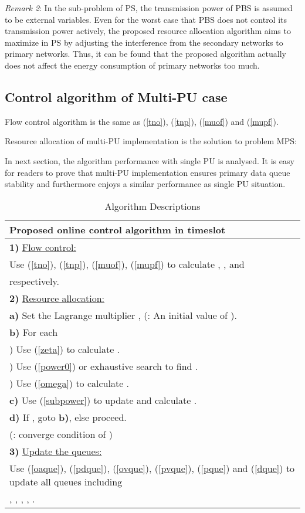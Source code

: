 \documentclass[journal]{IEEEtran}
\begin{document}
{\emph{Remark 2}:
 In the sub-problem of PS, the transmission power of PBS is assumed to be external variables. Even for the worst case that PBS does not control its transmission power actively, the proposed resource allocation algorithm aims to maximize  in PS by adjusting the interference from the secondary networks to primary networks. Thus, it can be found that the proposed algorithm actually does not affect the energy consumption of  primary networks too much.  }


 { \subsection{Control algorithm of Multi-PU case}

Flow control algorithm is the same as (\ref{tno}), (\ref{tnp}), (\ref{muof}) and  (\ref{mupf}).

Resource allocation of multi-PU implementation is the solution to problem MPS:


In next section, the algorithm performance with single PU is analysed. It is easy for  readers to prove that multi-PU implementation ensures primary data queue stability and furthermore enjoys a similar
performance as single PU situation. }
\begin{table}\label{alg}
\renewcommand{\arraystretch}{1.3}
\caption{Algorithm Descriptions}
\centering
\begin{tabular}{|l|}
\hline
{Proposed online control algorithm in timeslot }\\
\hline
\textbf{1)} \underline{Flow control:} \\
\quad Use (\ref{tno}), (\ref{tnp}), (\ref{muof}), (\ref{mupf}) to calculate , ,  and 
\\
\quad respectively.\\
\textbf{2)} \underline{Resource allocation:}\\
\quad \textbf{a)} Set the Lagrange multiplier , (: An initial value of ).\\
\quad \textbf{b)} For each \\
\qquad\qquad \romannumeral1) Use (\ref{zeta}) to calculate .\\
\qquad\qquad \romannumeral2) Use (\ref{power0}) or exhaustive search to find .\\
\qquad\qquad \romannumeral3) Use (\ref{omega}) to calculate .\\
\quad \textbf{c)} Use (\ref{subpower}) to update  and calculate .\\
\quad \textbf{d)} If , goto \textbf{b)}, else proceed.\\
 \qquad(: converge condition of )\\
\textbf{3)} \underline{Update the queues:}\\
 Use (\ref{oaque}), (\ref{pdque}), (\ref{ovque}), (\ref{pvque}), (\ref{pque}) and (\ref{dque}) to update all queues
 including \\, , , , .\\
\hline
\end{tabular}
\end{table}
\end{document}
